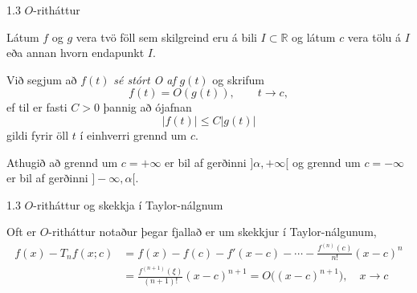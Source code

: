 %
\begin{frame}{1.3 $O$-ritháttur}

 
Látum $f$ og $g$ vera tvö föll sem skilgreind eru á bili $I \subset
\mathbb{R}$  og látum $c$ vera tölu á $I$ eða annan hvorn endapunkt $I$. 
\pause

Við segjum að $f(t)$ {\it sé stórt O
  af} $g(t)$ og skrifum 
\begin{equation*}
    f(t) = O(g(t)), \qquad t \rightarrow c,
\end{equation*}
ef til er fasti $C>0$ þannig að ójafnan
\begin{equation*}
    |f(t)| \leq C|g(t)|
\end{equation*}
gildi fyrir öll $t$ í einhverri grennd um $c$. 

\pause
\smallskip
Athugið
að grennd um $c=+\infty$ er bil af gerðinni $]\alpha,+\infty[$ og
grennd um $c=-\infty$ er bil af gerðinni $]-\infty,\alpha[$. 


\end{frame}
%

%
\begin{frame}{1.3 $O$-ritháttur og skekkja í Taylor-nálgnum} 


Oft er $O$-ritháttur notaður þegar fjallað er um skekkjur í
Taylor-nálgunum,
\begin{align*}
    f(x) - T_n f(x;c) &= f(x) - f(c) - f'(x-c) - \cdots 
    - \frac{f^{(n)}(c)}{n!}(x-c)^n \\
    &= \frac{f^{(n+1)}(\xi)}{(n+1)!}(x-c)^{n+1} =
    O\big((x-c)^{n+1}\big),  \quad x \to c
\end{align*}
\end{frame}
%

